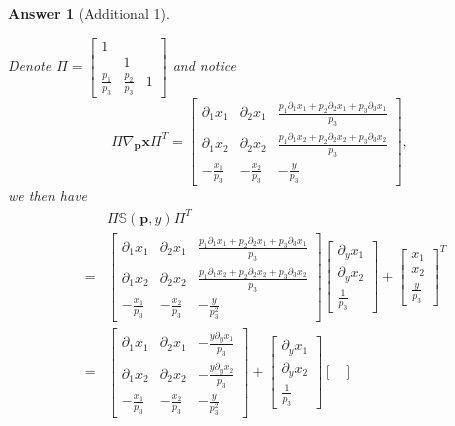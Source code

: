 \documentclass{article}
\newtheorem*{ans}{Answer}
\newcommand{\1}{{\bf 1}}
\newcommand{\bbS}{\mathbb{S}}
\newcommand{\0}{{\mathbf{0}}}
\newcommand{\p}{{\mathbf{p}}}
\newcommand{\x}{{\mathbf{x}}}
\newcommand{\<}{\langle}
\renewcommand{\>}{\rangle}
\begin{document}
\begin{ans}[Additional 1]
\begin{enumerate}[(a)]
Denote 
$\Pi = \begin{bmatrix}  1  \\ & 1 \\ \frac{p_1}{ p_3} & \frac{p_2}{ p_3} & 1\end{bmatrix}$ and notice $$\Pi \nabla_{\p} \x   \Pi^T =  \begin{bmatrix}
\partial_1 x_1 & 		\partial_2 x_1  & 		\frac{p_1 \partial_1 x_1 + p_2 \partial_2 x_1 +p_3 \partial_3 x_1}{p_3} \\
\partial_1 x_2 & 		\partial_2 x_2  & 		\frac{p_1 \partial_1 x_2 + p_2 \partial_2 x_2 +p_3 \partial_3 x_2}{p_3} \\
- \frac{x_1}{p_3} & 		- \frac{x_2}{p_3}  & 	-\frac{y}{ p_3 }
\end{bmatrix},$$
we then have
\begin{eqnarray*}
&& \Pi 	\bbS(\p,y)  \Pi^T \\
&=  & \begin{bmatrix}
\partial_1 x_1 & 		\partial_2 x_1  & 		\frac{p_1 \partial_1 x_1 + p_2 \partial_2 x_1 +p_3 \partial_3 x_1}{p_3} \\
\partial_1 x_2 & 		\partial_2 x_2  & 		\frac{p_1 \partial_1 x_2 + p_2 \partial_2 x_2 +p_3 \partial_3 x_2}{p_3} \\
- \frac{x_1}{p_3} & 		- \frac{x_2}{p_3}  & 	-\frac{y}{ p_3^2 }
\end{bmatrix}  \begin{bmatrix}
\partial_y x_1 \\ \partial_y x_2 \\ \frac1{p_3}
\end{bmatrix}  + \begin{bmatrix}
x_1 \\ x_2 \\ \frac{y}{p_3}
\end{bmatrix}^T \\
&=&  \begin{bmatrix}
	\partial_1 x_1 & 		\partial_2 x_1  & 	 -\frac{y \partial_y x_1}{p_3}\\
	\partial_1 x_2 & 		\partial_2 x_2  & 	 -\frac{y \partial_y x_2}{p_3} \\
	- \frac{x_1}{p_3} & 		- \frac{x_2}{p_3}  & 	-\frac{y}{ p_3^2}
\end{bmatrix} +\begin{bmatrix}
	\partial_y x_1 \\ \partial_y x_2 \\ \frac1{p_3}
\end{bmatrix}  \begin{bmatrix}

\end{bmatrix}
\end{eqnarray*}
\end{enumerate}
\end{ans}
\end{document}
